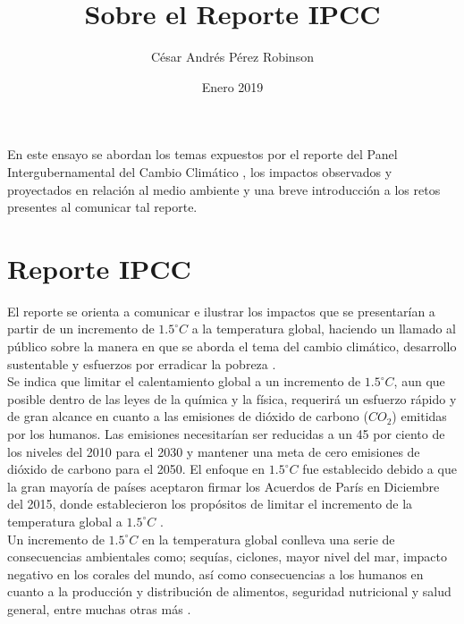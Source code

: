 \documentclass{article}
\title{Sobre el Reporte IPCC}
\author{César Andrés Pérez Robinson}
\date{Enero 2019}
\begin{document}
\maketitle

En este ensayo se abordan los temas expuestos por el reporte del Panel \\ Intergubernamental del Cambio Climático \cite{IPCC}, los impactos observados y proyectados en relación al medio ambiente y una breve introducción a los retos presentes al comunicar tal reporte.

\section{Reporte IPCC}
El reporte se orienta a comunicar e ilustrar los impactos  que se presentarían a partir de un incremento de $1.5^\circ C$ a la temperatura global, haciendo un llamado al público sobre la manera en que se aborda el tema del cambio climático, desarrollo sustentable y esfuerzos por erradicar la pobreza \cite{Allen}.
\\
Se indica que limitar el calentamiento global a un incremento de $1.5^{\circ}C$, aun que posible dentro de las leyes de la química y la física, requerirá un esfuerzo rápido y de gran alcance en cuanto a las emisiones de dióxido de carbono ($CO_{2}$) emitidas por los humanos. 
Las emisiones necesitarían ser reducidas a un 45 por ciento de los niveles del 2010 para el 2030 y mantener una meta de cero emisiones de dióxido de carbono para el 2050.
El enfoque en $1.5^{\circ}C$ fue establecido debido a que la gran mayoría de países aceptaron firmar los Acuerdos de París en Diciembre del 2015, donde establecieron los propósitos de limitar el incremento de la temperatura global a $1.5^{\circ}C$ \cite{Earth}.
\\
Un incremento de $1.5^{\circ}C$ en la temperatura global conlleva una serie de consecuencias ambientales como; sequías, ciclones, mayor nivel del mar, impacto negativo en los corales del mundo, así como consecuencias a los humanos en cuanto a la producción y distribución de alimentos, seguridad nutricional y salud general, entre muchas otras más \cite{Allen}. 
\end{document}

